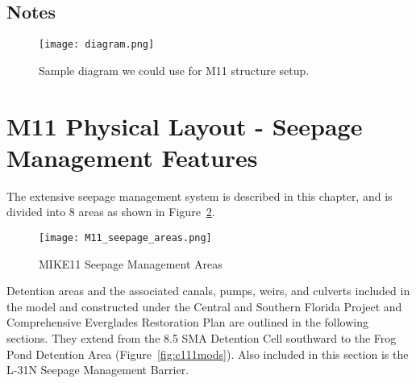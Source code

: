 \begin{notes}

\subsection{Notes}

\begin{figure}[!h]
  \begin{center}
  \texttt{[image: diagram.png]}
  \caption{Sample diagram we could use for M11 structure setup.}
  \label{fig:diagram}
  \end{center}
\end{figure}

\end{notes}

\cleardoublepage


\section{M11 Physical Layout - Seepage Management Features}
\label{sec:seepagefeatures}


The extensive seepage management system is described in this chapter, and is divided into 8 areas as shown in Figure~\ref{fig:M11_seepage_areas}.

\begin{figure}[!h]
  \begin{center}
  \texttt{[image: M11\_seepage\_areas.png]}
  \caption[MIKE11 Seepage Management Areas]{MIKE11 Seepage Management Areas}
  \label{fig:M11_seepage_areas}
  \end{center}
\end{figure}

\clearpage

Detention areas and the associated canals, pumps, weirs, and culverts included in the model and constructed under the Central and Southern Florida Project and Comprehensive Everglades Restoration Plan are outlined in the following sections. They extend from the 8.5 SMA Detention Cell southward to the Frog Pond Detention Area (Figure~\ref{fig:c111mods}). Also included in this section is the L-31N Seepage Management Barrier.

